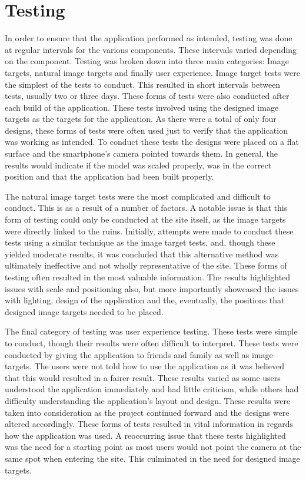 \section{Testing}
In order to ensure that the application performed as intended, testing was done at regular intervals for the various components. These intervals varied depending on the component.
Testing was broken down into three main categories: Image targets, natural image targets and finally user experience.
Image target tests were the simplest of the tests to conduct. This resulted in short intervals between tests, usually two or three days. These forms of tests were also conducted after each build of the application. These tests involved using the designed image targets as the targets for the application. As there were a total of only four designs, these forms of tests were often used just to verify that the application was working as intended. To conduct these tests the designs were placed on a flat surface and the smartphone's camera pointed towards them. In general, the results would indicate if the model was scaled properly, was in the correct position and that the application had been built properly.

The natural image target tests were the most complicated and difficult to conduct. This is as a result of a number of factors. A notable issue is that this form of testing could only be conducted at the site itself, as the image targets were directly linked to the ruins. Initially, attempts were made to conduct these tests using a similar technique as the image target tests, and, though these yielded moderate results, it was concluded that this alternative method was ultimately ineffective and not wholly representative of the site. These forms of testing often resulted in the most valuable information. The results highlighted issues with scale and positioning also, but more importantly showcased the issues with lighting, design of the application and the, eventually, the positions that designed image targets needed to be placed.

The final category of testing was user experience testing. These tests were simple to conduct, though their results were often difficult to interpret. These tests were conducted by giving the application to friends and family as well as image targets. The users were not told how to use the application as it was believed that this would resulted in a fairer result. These results varied as some users understood the application immediately and had little criticism, while others had difficulty understanding the application's layout and design. These results were taken into consideration as the project continued forward and the designs were altered accordingly. These forms of tests resulted in vital information in regards how the application was used. A reoccurring issue that these tests highlighted was the need for a starting point as most users would not point the camera at the same spot when entering the site. This culminated in the need for designed image targets. 

